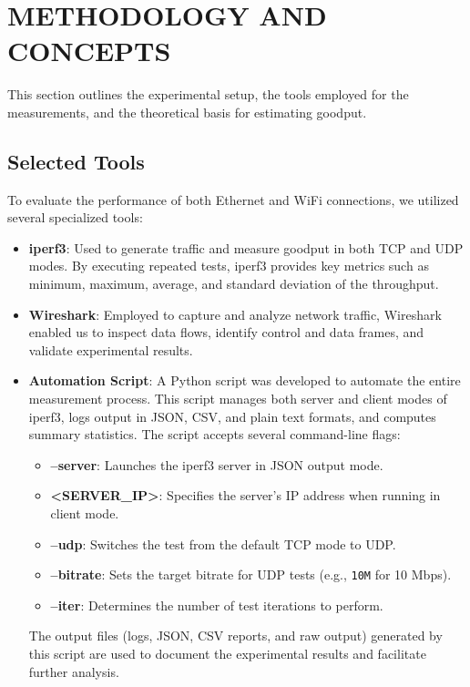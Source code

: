 
\section{METHODOLOGY AND CONCEPTS} \label{sec:methodology-and-concepts}


    This section outlines the experimental setup, the tools employed for the measurements, and the theoretical basis for estimating goodput.

    \subsection{Selected Tools} \label{subsec:selected-tools}

        To evaluate the performance of both Ethernet and WiFi connections, we utilized several specialized tools:

        \begin{itemize}
            \item \textbf{iperf3}: Used to generate traffic and measure goodput in both TCP and UDP modes. By executing repeated tests, iperf3 provides key metrics such as minimum, maximum, average, and standard deviation of the throughput.
            \item \textbf{Wireshark}: Employed to capture and analyze network traffic, Wireshark enabled us to inspect data flows, identify control and data frames, and validate experimental results.
            \item \textbf{Automation Script}: A Python script was developed to automate the entire measurement process. This script manages both server and client modes of iperf3, logs output in JSON, CSV, and plain text formats, and computes summary statistics. The script accepts several command-line flags:
            \begin{itemize}
                \item \textbf{--server}: Launches the iperf3 server in JSON output mode.
                \item \textbf{<SERVER\_IP>}: Specifies the server's IP address when running in client mode.
                \item \textbf{--udp}: Switches the test from the default TCP mode to UDP.
                \item \textbf{--bitrate}: Sets the target bitrate for UDP tests (e.g., \texttt{10M} for 10 Mbps).
                \item \textbf{--iter}: Determines the number of test iterations to perform.
            \end{itemize}
            The output files (logs, JSON, CSV reports, and raw output) generated by this script are used to document the experimental results and facilitate further analysis.
        \end{itemize}

